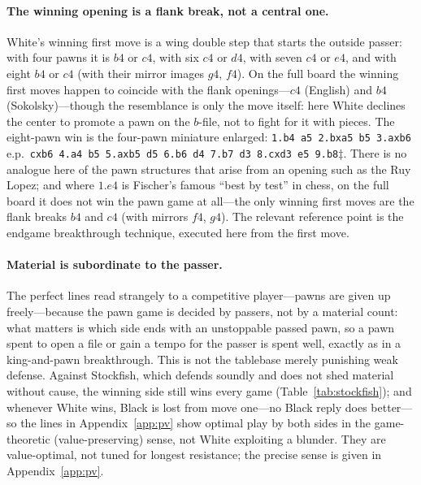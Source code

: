 \documentclass[Afour,sageapa,times]{sagej}
\theoremstyle{plain}
\theoremstyle{definition}
\newcommand{\nEightLossOpening}{$b4$ or $c4$ (with their mirror images $g4$, $f4$)}
\newcommand{\nEightLossPVeight}{\texttt{1.b4 a5 2.bxa5 b5 3.axb6}\,e.p.\
\texttt{cxb6 4.a4 b5 5.axb5 d5 6.b6 d4 7.b7 d3 8.cxd3 e5 9.b8}$\ddagger$}
\begin{document}
\paragraph{The winning opening is a flank break, not a central one.} White's
winning first move is a wing double step that starts the outside passer: with
four pawns it is $b4$ or $c4$, with six $c4$ or $d4$, with seven $c4$ or $e4$,
and with eight \nEightLossOpening. On the full board the winning first moves happen
to coincide with the flank openings---$c4$ (English) and $b4$ (Sokolsky)---though
the resemblance is only the move itself: here White declines the center to promote a
pawn on the $b$-file, not to fight for it with pieces. The eight-pawn win is the
four-pawn miniature enlarged: \nEightLossPVeight. There is no analogue here of the
pawn structures that arise from an opening such as the Ruy Lopez; and where $1.e4$
is Fischer's famous ``best by test'' in chess, on the full board it does not win the
pawn game at all---the only winning first moves are the flank breaks $b4$ and $c4$
(with mirrors $f4$, $g4$). The relevant reference point is the endgame breakthrough
technique, executed here from the first move.

\paragraph{Material is subordinate to the passer.} The perfect lines read
strangely to a competitive player---pawns are given up freely---because the pawn
game is decided by passers, not by a material count: what matters is which side
ends with an unstoppable passed pawn, so a pawn spent to open a file or gain a tempo
for the passer is spent well, exactly as in a king-and-pawn breakthrough. This is not
the tablebase merely punishing weak defense. Against Stockfish, which defends soundly
and does not shed material without cause, the winning side still wins every game
(Table~\ref{tab:stockfish}); and whenever White wins, Black is lost from move one---no
Black reply does better---so the lines in Appendix~\ref{app:pv} show optimal play by
both sides in the game-theoretic (value-preserving) sense, not White exploiting a
blunder. They are value-optimal, not tuned for longest resistance; the precise sense
is given in Appendix~\ref{app:pv}.
\end{document}
